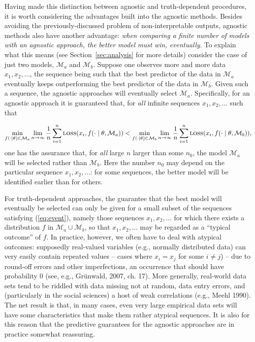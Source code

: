 \documentclass[authoryear]{elsarticle}
\newcommand{\loss}{\mbox{\sc loss}}
\newcommand{\model}{\mathcal{M}}
\begin{document}
Having made this distinction between agnostic and truth-dependent
procedures, it is worth considering the advantages built into the
agnostic methods.  Besides avoiding the previously-discussed problem
of non-interpretable outputs, agnostic methods also have another
advantage: {\em when comparing a finite number of models with an
  agnostic approach, the better model must win, eventually}. To
explain what this means (see Section~\ref{sec:analysis} for more
details) consider the case of just two models, $\model_a$ and
$\model_b$. Suppose one observes more and more data $x_1, x_2,
\ldots$, the sequence being such that the best predictor of the data
in $\model_a$ eventually keeps outperforming the best predictor of the
data in $\model_b$.  Given such a sequence, the agnostic approaches
will eventually select $\model_a$. Specifically, for an agnostic
approach it is guaranteed that, for {\em all\/} infinite sequences
$x_1, x_2, \ldots$ such that

\vspace*{-24pt}
\begin{equation}
\label{eq:event}
\min_{f(\cdot \mid \theta) \in \model_a}
\lim_{n \rightarrow \infty} \frac{1}{n} \sum_{i=1}^n
\loss(x_i,f(\cdot \mid \theta,\model_a))
<  \min_{f(\cdot \mid \theta) \in \model_b}
\lim_{n \rightarrow \infty} \frac{1}{n} \sum_{i=1}^n
\loss(x_i,f(\cdot \mid {\theta}, \model_b)),
\end{equation}
one has the assurance that, for {\em all\/} large $n$ larger than some
$n_0$, the model $\model_a$ will be selected rather than $\model_b$.
Here the number $n_0$ may depend on the particular sequence $x_1, x_2,
\ldots$: for some sequences, the better model will be identified
earlier than for others.

For truth-dependent approaches, the guarantee that the best model will
eventually be selected can only be given for a small subset of the
sequences satisfying (\ref{eq:event}), namely those sequences $x_1,
x_2, \ldots$ for which there exists a distribution $f$ in $\model_a
\cup \model_b$, so that $x_1, x_2, \ldots$ may be regarded as a
``typical outcome'' of $f$. In practice, however, we often have to
deal with atypical outcomes: supposedly real-valued variables (e.g.,
normally distributed data) can very easily contain repeated values --
cases where $x_i = x_j$ for some $i \neq j$) -- due to round-off
errors and other imperfections, an occurrence that should have
probability 0 (see, e.g., Gr\"unwald, 2007, ch. 17). More generally,
real-world data sets tend to be riddled with data missing not at
random, data entry errors, and (particularly in the social sciences) a
host of weak correlations (e.g., Meehl 1990). The net result is that,
in many cases, even very large empirical data sets will have some
characteristics that make them rather atypical sequences. It is also for
this reason that the predictive guarantees for the agnostic approaches
are in practice somewhat reassuring.
\end{document}
